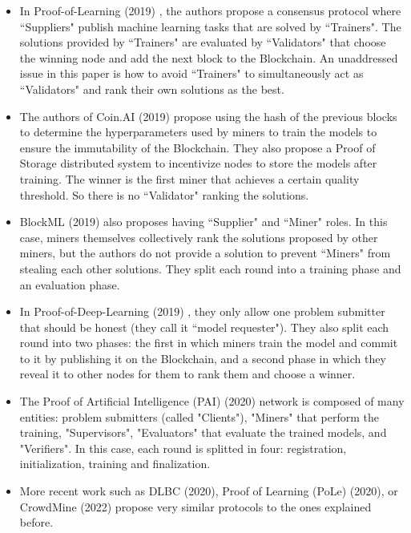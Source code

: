 \documentclass[conference]{IEEEtran}
\begin{document}
\begin{itemize}
\item In Proof-of-Learning (2019) \cite{b7}, the authors propose a consensus protocol where ``Suppliers" publish machine learning tasks that are solved by ``Trainers". The solutions provided by ``Trainers" are evaluated by ``Validators" that choose the winning node and add the next block to the Blockchain. An unaddressed issue in this paper is how to avoid ``Trainers" to simultaneously act as ``Validators" and rank their own solutions as the best.
\item The authors of Coin.AI (2019) \cite{b8} propose using the hash of the previous blocks to determine the hyperparameters used by miners to train the models to ensure the immutability of the Blockchain. They also propose a Proof of Storage distributed system to incentivize nodes to store the models after training. The winner is the first miner that achieves a certain quality threshold. So there is no ``Validator" ranking the solutions.
\item BlockML (2019) \cite{b9} also proposes having ``Supplier" and ``Miner" roles. In this case, miners themselves collectively rank the solutions proposed by other miners, but the authors do not provide a solution to prevent ``Miners" from stealing each other solutions. They split each round into a training phase and an evaluation phase.
\item In Proof-of-Deep-Learning (2019) \cite{b10}, they only allow one problem submitter that should be honest (they call it ``model requester"). They also split each round into two phases: the first in which miners train the model and commit to it by publishing it on the Blockchain, and a second phase in which they reveal it to other nodes for them to rank them and choose a winner.
\item The Proof of Artificial Intelligence (PAI) (2020) \cite{b11} network is composed of many entities: problem submitters (called "Clients"), "Miners" that perform the training, "Supervisors", "Evaluators" that evaluate the trained models, and "Verifiers". In this case, each round is splitted in four: registration, initialization, training and finalization.
\item More recent work such as DLBC (2020)\cite{b12}, Proof of Learning (PoLe) (2020)\cite{b13}, or CrowdMine (2022)\cite{b14} propose very similar protocols to the ones explained before.

\end{itemize}
\end{document}
